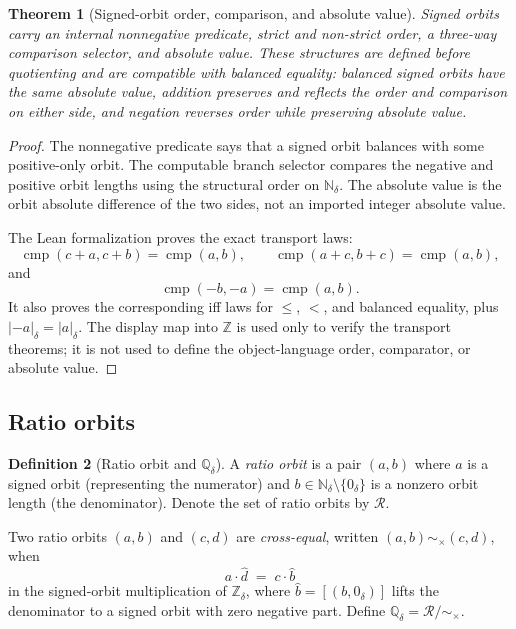 \documentclass[11pt,a4paper]{article}
\newtheorem{theorem}{Theorem}[section]
\theoremstyle{definition}
\newtheorem{definition}[theorem]{Definition}
\theoremstyle{remark}
\begin{document}
\begin{theorem}[Signed-orbit order, comparison, and absolute value]
\label{thm:signedorder}
Signed orbits carry an internal nonnegative predicate, strict and non-strict
order, a three-way comparison selector, and absolute value. These structures
are defined before quotienting and are compatible with balanced equality:
balanced signed orbits have the same absolute value, addition preserves and
reflects the order and comparison on either side, and negation reverses order
while preserving absolute value.
\end{theorem}

\begin{proof}
The nonnegative predicate says that a signed orbit balances with some
positive-only orbit. The computable branch selector compares the negative and
positive orbit lengths using the structural order on $\mathbb{N}_\delta$. The
absolute value is the orbit absolute difference of the two sides, not an
imported integer absolute value.

The Lean formalization proves the exact transport laws:
\[
  \operatorname{cmp}(c+a,c+b)=\operatorname{cmp}(a,b),\qquad
  \operatorname{cmp}(a+c,b+c)=\operatorname{cmp}(a,b),
\]
and
\[
  \operatorname{cmp}(-b,-a)=\operatorname{cmp}(a,b).
\]
It also proves the corresponding iff laws for $\leq$, $<$, and balanced
equality, plus $|-a|_\delta=|a|_\delta$. The display map into $\mathbb{Z}$ is
used only to verify the transport theorems; it is not used to define the
object-language order, comparator, or absolute value.
\end{proof}

\subsection{Ratio orbits}

\begin{definition}[Ratio orbit and $\mathbb{Q}_\delta$]\label{def:ratioorbit}
A \emph{ratio orbit} is a pair $(a, b)$ where $a$ is a signed orbit
(representing the numerator) and $b \in \mathbb{N}_\delta \setminus
\{0_\delta\}$ is a nonzero orbit length (the denominator). Denote the set of
ratio orbits by $\mathcal{R}$.

Two ratio orbits $(a,b)$ and $(c,d)$ are \emph{cross-equal}, written
$(a,b) \sim_\times (c,d)$, when
\[
  a \cdot \widehat{d} \;=\; c \cdot \widehat{b}
\]
in the signed-orbit multiplication of $\mathbb{Z}_\delta$, where
$\widehat{b} = [(b, 0_\delta)]$ lifts the denominator to a signed orbit with
zero negative part. Define $\mathbb{Q}_\delta = \mathcal{R} / {\sim_\times}$.
\end{definition}
\end{document}

